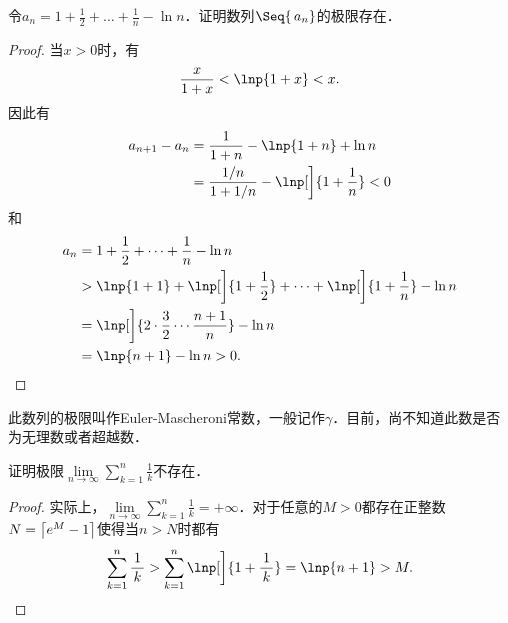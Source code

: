 \begin{example*}
  令\(a_n = 1 + \frac12 + \dots + \frac1n - \ln n\)．证明数列\(\Seq{\,a_n}\)的极限存在．\rule{0ex}{3.5ex}

  \begin{proof}
    当\(x > 0\)时，有
    \begin{equation*}
      \frac{x}{1+x} < \lnp{1+x} < x.
    \end{equation*}
    因此有
    \begin{align*}
      a_{n+1} - a_n
      &= \frac{1}{1+n} - \lnp{1+n} + \ln n \\
      &= \frac{1/n}{1+1/n} - \lnp[\bigg]{1+\frac1n} < 0
    \end{align*}
    和
    \begin{align*}
      a_n
      &= 1 + \frac12 + \dots + \frac1n - \ln n \\
      &> \lnp{1+1} + \lnp[\bigg]{1+\frac12} + \dots + \lnp[\bigg]{1+\frac1n} - \ln n \\
      &= \lnp[\bigg]{2 \cdot \frac32 \dotsm \frac{n+1}{n}} - \ln n \\
      &= \lnp{n + 1} - \ln n > 0. \qedhere
    \end{align*}
  \end{proof}

  \begin{remark}
    此数列的极限叫作Euler-Mascheroni常数，一般记作\(γ\)．目前，尚不知道此数是否为无理数或者超越数．
  \end{remark}
\end{example*}

\begin{example*}
  证明极限\(\lim\limits_{n\to\infty} \sum\limits_{k=1}^n \! \frac1k\)不存在．

  \begin{proof}
    实际上，\(\lim\limits_{n\to\infty} \sum\limits_{k=1}^n \! \frac1k = +∞\)．对于任意的\(M > 0\)都存在正整数\(N = \ceil[\big]{e^M-1}\)使得当\(n > N\)时都有
    \begin{equation*}
      \sum_{k=1}^n \frac1{\,k\,}
      > \sum_{k=1}^n \lnp[\bigg]{1+\frac1{\,k\,}}
      = \lnp{n+1} > M.
      \qedhere
    \end{equation*}
  \end{proof}
\end{example*}

